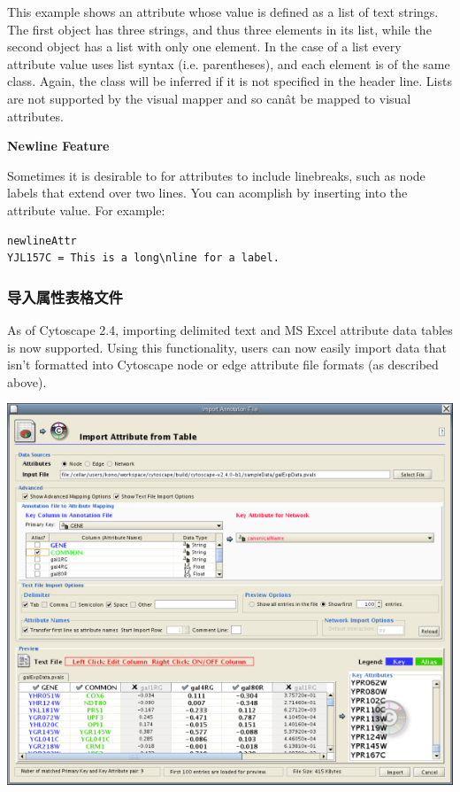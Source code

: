  This example shows an attribute whose value is defined as a list of text
strings. The first object has three strings, and thus three elements in its
list, while the second object has a list with only one element. In the case of
a list every attribute value uses list syntax (i.e. parentheses), and each
element is of the same class. Again, the class will be inferred if it is not
specified in the header line. Lists are not supported by the visual mapper and
so can\^at be mapped to visual attributes. 

\textbf{Newline Feature}

Sometimes it is desirable to for attributes to include linebreaks, such as node
labels that extend over two lines. You can acomplish by inserting   into the
attribute value. For example: 

 \begin{verbatim}
newlineAttr
YJL157C = This is a long\nline for a label.
\end{verbatim}

\subsubsection{导入属性表格文件}

 As of Cytoscape 2.4, importing delimited text and MS Excel attribute data
tables is now supported. Using this functionality, users can now easily import
data that isn't formatted into Cytoscape node or edge attribute file formats
(as described above). 

 \includegraphics[scale=1]{images/attribute_table_import_main.png} 

